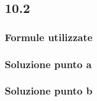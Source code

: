 \documentclass[../../main.tex]{subfiles}
\begin{document}
\subsection*{10.2}
\subsubsection*{Formule utilizzate}
\subsubsection*{Soluzione punto a}
\subsubsection*{Soluzione punto b}
\newpage
\end{document}
